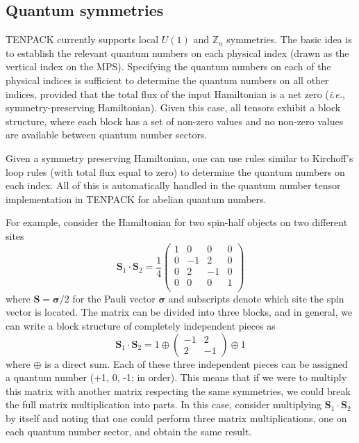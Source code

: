 \documentclass{juliacon}
\begin{document}
\subsection{Quantum symmetries}
\label{qsymmetries}

TENPACK currently supports local $U(1)$ and $\mathbb{Z}_n$ symmetries. The basic idea is to establish the relevant quantum numbers on each physical index (drawn as the vertical index on the MPS). Specifying the quantum numbers on each of the physical indices is sufficient to determine the quantum numbers on all other indices, provided that the total flux of the input Hamiltonian is a net zero ({\it i.e.}, symmetry-preserving Hamiltonian). Given this case, all tensors exhibit a block structure, where each block has a set of non-zero values and no non-zero values are available between quantum number sectors.

Given a symmetry preserving Hamiltonian, one can use rules similar to Kirchoff's loop rules (with total flux equal to zero) to determine the quantum numbers on each index. All of this is automatically handled in the quantum number tensor implementation in TENPACK for abelian quantum numbers. 

For example, consider the Hamiltonian for two spin-half objects on two different sites
\begin{equation}
\mathbf{S}_1\cdot\mathbf{S}_2=\frac14\left(\begin{array}{cccc}
1 & 0 & 0 & 0\\
0 & -1 & 2 & 0\\
0 & 2 & -1 & 0\\
0 & 0 & 0 & 1\\
\end{array}\right)
\end{equation}
where $\mathbf{S}=\boldsymbol{\sigma}/2$ for the Pauli vector $\boldsymbol{\sigma}$ \cite{townsend2000modern} and subscripts denote which site the spin vector is located. The matrix can be divided into three blocks, and in general, we can write a block structure of completely independent pieces as
\begin{equation}
\mathbf{S}_1\cdot\mathbf{S}_2=1\oplus\left(\begin{array}{cc}
-1 & 2 \\
2 & -1
\end{array}\right)\oplus1
\end{equation}
where $\oplus$ is a direct sum. Each of these three independent pieces can be assigned a quantum number (+1, 0, -1; in order). This means that if we were to multiply this matrix with another matrix respecting the same symmetries, we could break the full matrix multiplication into parts. In this case, consider multiplying $\mathbf{S}_1\cdot\mathbf{S}_2$ by itself and noting that one could perform three matrix multiplications, one on each quantum number sector, and obtain the same result.
\end{document}
